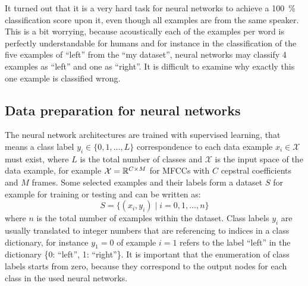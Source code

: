 \FloatBarrier
\noindent
It turned out that it is a very hard task for neural networks to achieve a \SI{100}{\percent} classification score upon it, even though all examples are from the same speaker.
This is a bit worrying, because acoustically each of the examples per word is perfectly understandable for humans and for instance in the classification of the five examples of \enquote{left} from the \enquote{my dataset}, neural networks may classify 4 examples as \enquote{left} and one as \enquote{right}.
It is difficult to examine why exactly this one example is classified wrong.



\subsection{Data preparation for neural networks}\label{sec:exp_data_prep}
The neural network architectures are trained with supervised learning, that means a class label $y_i \in \{0, 1, \dots, L\}$ correspondence to each data example $x_i \in \mathcal{X}$ must exist, where $L$ is the total number of classes and $\mathcal{X}$ is the input space of the data example, for example $\mathcal{X} = \mathbb{R}^{C \times M}$ for MFCCs with $C$ cepstral coefficients and $M$ frames.
Some selected examples and their labels form a dataset $S$ for example for training or testing and can be written as:
\begin{equation}\label{eq:exp_dataset}
  S = \{ (x_i, y_i) \mid i = 0, 1, \dots, n \}
\end{equation}
where $n$ is the total number of examples within the dataset.
Class labels $y_i$ are usually translated to integer numbers that are referencing to indices in a class dictionary, for instance $y_1 = 0$ of example $i=1$ refers to the label \enquote{left} in the dictionary \{0: \enquote{left}, 1: \enquote{right}\}.
It is important that the enumeration of class labels starts from zero, because they correspond to the output nodes for each class in the used neural networks.

